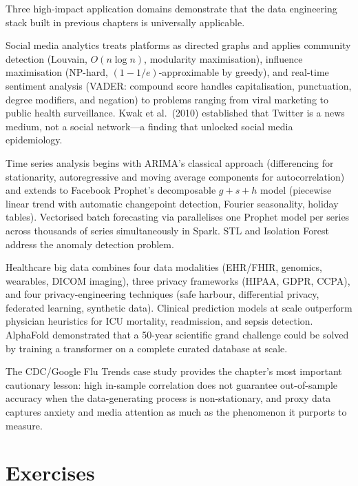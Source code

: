 Three high-impact application domains demonstrate that the data
engineering stack built in previous chapters is universally applicable.

Social media analytics treats platforms as directed graphs and applies
community detection (Louvain, $O(n \log n)$, modularity maximisation),
influence maximisation (NP-hard, $(1-1/e)$-approximable by greedy),
and real-time sentiment analysis (VADER: compound score handles
capitalisation, punctuation, degree modifiers, and negation) to problems
ranging from viral marketing to public health surveillance. Kwak et al.\ (2010)
established that Twitter is a news medium, not a social network---a finding
that unlocked social media epidemiology.

Time series analysis begins with ARIMA's classical approach (differencing
for stationarity, autoregressive and moving average components for
autocorrelation) and extends to Facebook Prophet's decomposable
$g + s + h$ model (piecewise linear trend with automatic changepoint
detection, Fourier seasonality, holiday tables). Vectorised batch
forecasting via  parallelises one Prophet model
per series across thousands of series simultaneously in Spark. STL and
Isolation Forest address the anomaly detection problem.

Healthcare big data combines four data modalities (EHR/FHIR, genomics,
wearables, DICOM imaging), three privacy frameworks (HIPAA, GDPR, CCPA),
and four privacy-engineering techniques (safe harbour, differential
privacy, federated learning, synthetic data). Clinical prediction models
at scale outperform physician heuristics for ICU mortality, readmission,
and sepsis detection. AlphaFold demonstrated that a 50-year scientific
grand challenge could be solved by training a transformer on a complete
curated database at scale.

The CDC/Google Flu Trends case study provides the chapter's most
important cautionary lesson: high in-sample correlation does not guarantee
out-of-sample accuracy when the data-generating process is non-stationary,
and proxy data captures anxiety and media attention as much as the
phenomenon it purports to measure.

\section*{Exercises}
\label{sec:ch10-exercises}

